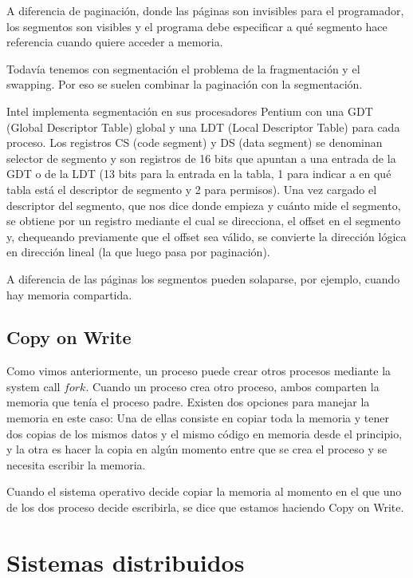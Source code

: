 \documentclass{article}
\begin{document}
A diferencia de paginaci\'on, donde las p\'aginas son invisibles para el programador, los segmentos son visibles y el programa debe especificar a qu\'e segmento hace referencia cuando quiere acceder a memoria.

Todav\'ia tenemos con segmentaci\'on el problema de la fragmentaci\'on y el swapping. Por eso se suelen combinar la paginaci\'on con la segmentaci\'on.

Intel implementa segmentaci\'on en sus procesadores Pentium con una GDT (Global Descriptor Table) global y una LDT (Local Descriptor Table) para cada proceso. Los registros CS (code segment) y DS (data segment) se denominan selector de segmento y son registros de 16 bits que apuntan a una entrada de la GDT o de la LDT (13 bits para la entrada en la tabla, 1 para indicar a en qu\'e tabla est\'a el descriptor de segmento y 2 para permisos). Una vez cargado el descriptor del segmento, que nos dice donde empieza y cu\'anto mide el segmento, se obtiene por un registro mediante el cual se direcciona, el offset en el segmento y, chequeando previamente que el offset sea v\'alido, se convierte la direcci\'on l\'ogica en direcci\'on lineal (la que luego pasa por paginaci\'on).

A diferencia de las p\'aginas los segmentos pueden solaparse, por ejemplo, cuando hay memoria compartida.

\subsection{Copy on Write}

Como vimos anteriormente, un proceso puede crear otros procesos mediante la system call $fork$. Cuando un proceso crea otro proceso, ambos comparten la memoria que ten\'ia el proceso padre. Existen dos opciones para manejar la memoria en este caso: Una de ellas consiste en copiar toda la memoria y tener dos copias de los mismos datos y el mismo c\'odigo en memoria desde el principio, y la otra es hacer la copia en alg\'un momento entre que se crea el proceso y se necesita escribir la memoria.

Cuando el sistema operativo decide copiar la memoria al momento en el que uno de los dos proceso decide escribirla, se dice que estamos haciendo Copy on Write.


\section{Sistemas distribuidos}
\end{document}
